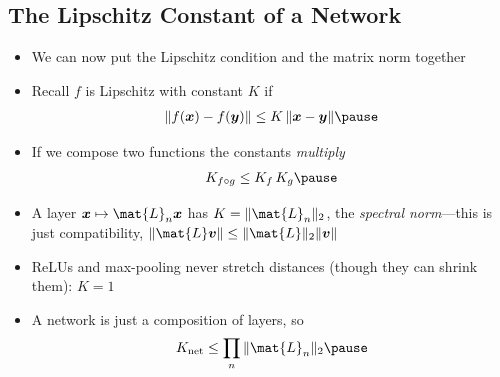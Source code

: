 \begin{slide}
\section[-2]{The Lipschitz Constant of a Network}

\begin{PauseHighLight}\small
  \begin{itemize}\squeeze
  \item We can now put the Lipschitz condition and the matrix norm
    together\pause
  \item Recall $f$ is Lipschitz with constant $K$ if
    \begin{align*}
      \len{f(\bm{x}) - f(\bm{y})} \leq K \, \len{\bm{x}-\bm{y}}\pause
    \end{align*}
  \item If we compose two functions the constants \emph{multiply}
    \begin{align*}
      K_{f\circ g} \leq K_f \, K_g\pause
    \end{align*}
  \item A layer $\bm{x} \mapsto \mat{L}_n \bm{x}$ has $K =
    \len{\mat{L}_n}_2$, the \emph{spectral norm}---this is just
    compatibility, $\len{\mat{L}\bm{v}} \leq \len{\mat{L}}_2
    \len{\bm{v}}$\pause
  \item ReLUs and max-pooling never stretch distances (though they can
    shrink them): $K=1$\pause
  \item A network is just a composition of layers, so
    \begin{align*}
      K_{\mathrm{net}} \leq \prod_n \len{\mat{L}_n}_2\pause
    \end{align*}
  \end{itemize}
\end{PauseHighLight}

\end{slide}


